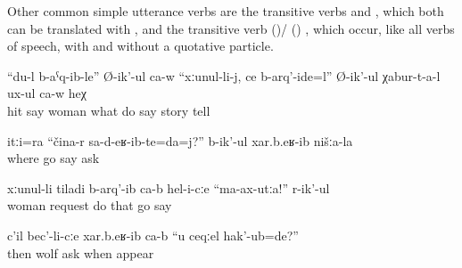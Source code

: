 Other common simple utterance verbs are the transitive verbs  and , which both can be translated with , and the transitive verb  ()\slash{} () , which occur, like all verbs of speech, with and without a quotative particle.
%
\begin{exe}
	\ex	\label{ex:I hit my wife, what should I do, he says, he is telling the stories}
	\gll	``du-l	b-aˁq-ib-le''	Ø-ik'-ul	ca-w	``xːunul-li-j,	ce	b-arq'-ide=l''	Ø-ik'-ul	χabur-t-a-l	ux-ul	ca-w	heχ\\
			hit	say		woman	what	do	say	story	tell			\\
	\glt	{}

	\ex	\label{ex:They asked us, where did you come from}
	\gll	itːi=ra	``čina-r	sa-d-eʁ-ib-te=da=j?''	b-ik'-ul	xar.b.eʁ-ib	nišːa-la\\
			where	go	say	ask	\\
	\glt	{}

	\ex	\label{ex:‎His wife begged him, Do not go}
	\gll	xːunul-li	tiladi	b-arq'-ib	ca-b	hel-i-cːe	``ma-ax-utːa!''	r-ik'-ul\\
		woman	request	do		that	go	say\\
	\glt	{}
	
	\ex	\label{ex:‎‎Then they asked the wolf, When were you born?}
	\gll	c'il	bec'-li-cːe	xar.b.eʁ-ib	ca-b	``u	ceqːel	hak'-ub=de?''\\
		then	wolf	ask			when	appear\\
	\glt	{}
	
\end{exe}

